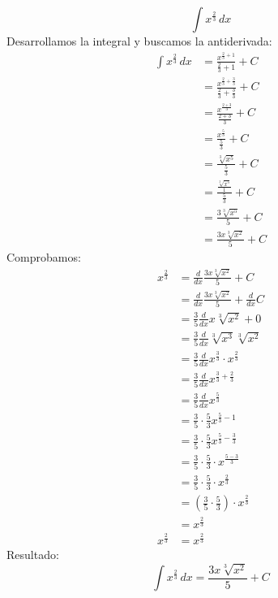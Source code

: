 \documentclass[letterpaper]{article}
\begin{document}
		\vspace{0.5cm}
		\[ \int x^{ \frac{2}{3} } \, dx \]
		\vspace{0.5cm}
		\vspace{0.2cm}
		Desarrollamos la integral y buscamos la antiderivada:
		\begin{align*}
			\int x^{ \frac{2}{3} } \, dx &= \frac{x^{ \frac{2}{3} + 1}}{ \frac{2}{3} + 1} + C \\
			&= \frac{x^{ \frac{2}{3} + \frac{3}{3} }}{ \frac{2}{3} + \frac{3}{3} } + C \\
			&= \frac{x^{ \frac{2 + 3}{3} }}{ \frac{2 + 3}{3} } + C \\
			&= \frac{x^{ \frac{5}{3} }}{ \frac{5}{3} } + C \\
			&= \frac{ \sqrt[3]{x^5} }{ \frac{5}{3} } + C \\
			&= \frac{ \frac{ \sqrt[3]{x^5} }{1} }{ \frac{5}{3} } + C \\
			&= \frac{3  \sqrt[3]{x^5}}{5} + C \\
			&= \frac{3x \sqrt[3]{x^2}}{5} + C
		\end{align*}
		\vspace{0.2cm}
		Comprobamos:
		\begin{align*}
			x^{ \frac{2}{3} } &= \frac{d}{dx} \frac{3x \sqrt[3]{x^2}}{5} + C \\
			&= \frac{d}{dx} \frac{3x \sqrt[3]{x^2}}{5} + \frac{d}{dx} C \\
			&= \frac{3}{5} \frac{d}{dx} x \sqrt[3]{x^2} + 0 \\
			&= \frac{3}{5} \frac{d}{dx} \sqrt[3]{x^3} \sqrt[3]{x^2} \\
			&= \frac{3}{5} \frac{d}{dx} x^{ \frac{3}{3} } \cdot x^{ \frac{2}{3} } \\
			&= \frac{3}{5} \frac{d}{dx} x^{ \frac{3}{3} + \frac{2}{3} } \\
			&= \frac{3}{5} \frac{d}{dx} x^{ \frac{5}{3} } \\
			&= \frac{3}{5} \cdot \frac{5}{3} x^{\frac{5}{3} - 1} \\
			&= \frac{3}{5} \cdot \frac{5}{3} x^{ \frac{5}{3} - \frac{3}{3} } \\
			&= \frac{3}{5} \cdot \frac{5}{3} \cdot x^{ \frac{5 - 3}{3} } \\
			&= \frac{3}{5} \cdot \frac{5}{3} \cdot x^{ \frac{2}{3} } \\
			&= \left( \frac{3}{5} \cdot \frac{5}{3} \right) \cdot x^{ \frac{2}{3} } \\
			&= x^{ \frac{2}{3} } \\
			x^{ \frac{2}{3} } &= x^{ \frac{2}{3} }
		\end{align*}
		\vspace{0.2cm}
		Resultado:
		\[ \int x^{ \frac{2}{3} } \, dx = \frac{ 3x \sqrt[3]{x^2}}{5} + C \]
\end{document}
